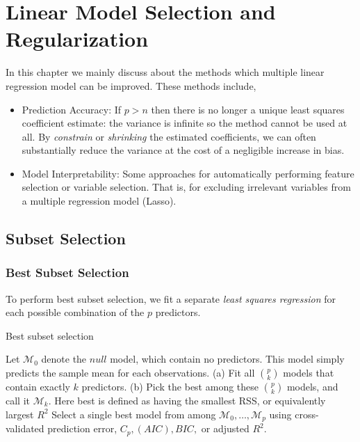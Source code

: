 \documentclass[12pt,a4paper]{article}%
\theoremstyle{definition}
\theoremstyle{plain}
\numberwithin{equation}{section}
\begin{document}
\setcounter{section}{5}
\section{Linear Model Selection and Regularization}
In this chapter we mainly discuss about the methods which multiple linear regression model can be improved. These methods include,
\begin{itemize}
\item Prediction Accuracy: If $p > n$ then there is no longer a unique least squares coefficient estimate: the variance is infinite so the method cannot be used at all. By \textit{constrain} or \textit{shrinking} the estimated coefficients, we can often substantially reduce the variance at the cost of a negligible increase in bias. 
\item Model Interpretability:  Some approaches for automatically performing feature selection or variable selection. That is, for excluding irrelevant variables from a multiple regression model (Lasso).
\end{itemize}

\subsection{\textbf{Subset Selection}}
\subsubsection{\textbf{Best Subset Selection}}
To perform best subset selection, we fit a separate \textit{least squares regression} for each possible combination of the $p$ predictors.
\begin{algorithm}[H]
\caption{Best subset selection}\label{best-subset}
\begin{algorithmic}[1]
\State Let $\mathcal{M}_{0}$ denote the $null$ model, which contain no predictors. This model simply predicts the sample mean for each observations.
\State (a) Fit all ${p}\choose{k}$ models that contain exactly $k$ predictors.
\State (b) Pick the best among these ${p}\choose{k}$ models, and call it $\mathcal{M}_{k}$. Here best is defined as having the smallest RSS, or equivalently largest $R^{2}$
\EndFor
\State Select a single best model from among $\mathcal{M}_{0},\dots,\mathcal{M}_{p}$ using cross-validated prediction error, $C_{p},(AIC),BIC,$ or adjusted $R^{2}$.
\end{algorithmic}
\end{algorithm}
\end{document}
